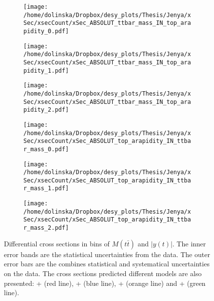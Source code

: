 \begin{sidewaysfigure}[p]
\centering
\begin{subfigure}
  \centering
  \texttt{[image: /home/dolinska/Dropbox/desy\_plots/Thesis/Jenya/xSec/xsecCount/xSec\_ABSOLUT\_ttbar\_mass\_IN\_top\_arapidity\_0.pdf]}
\end{subfigure}
\begin{subfigure}
  \centering
  \texttt{[image: /home/dolinska/Dropbox/desy\_plots/Thesis/Jenya/xSec/xsecCount/xSec\_ABSOLUT\_ttbar\_mass\_IN\_top\_arapidity\_1.pdf]}
\end{subfigure}
\begin{subfigure}
  \centering
  \texttt{[image: /home/dolinska/Dropbox/desy\_plots/Thesis/Jenya/xSec/xsecCount/xSec\_ABSOLUT\_ttbar\_mass\_IN\_top\_arapidity\_2.pdf]}
\end{subfigure}
\begin{subfigure}
  \centering
  \texttt{[image: /home/dolinska/Dropbox/desy\_plots/Thesis/Jenya/xSec/xsecCount/xSec\_ABSOLUT\_top\_arapidity\_IN\_ttbar\_mass\_0.pdf]}
\end{subfigure}
\begin{subfigure}
  \centering
  \texttt{[image: /home/dolinska/Dropbox/desy\_plots/Thesis/Jenya/xSec/xsecCount/xSec\_ABSOLUT\_top\_arapidity\_IN\_ttbar\_mass\_1.pdf]}
\end{subfigure}
\begin{subfigure}
  \centering
  \texttt{[image: /home/dolinska/Dropbox/desy\_plots/Thesis/Jenya/xSec/xsecCount/xSec\_ABSOLUT\_top\_arapidity\_IN\_ttbar\_mass\_2.pdf]}
\end{subfigure}
\caption{Differential cross sections in bins of $M(t\bar{t})$ and $|y(t)|$. The inner error bands are the statistical uncertainties from the data.
         The outer error bars are the combines statistical and systematical uncertainties on the data. The cross sections predicted different models are also presented:
         \MG + \PYTHIA (red line), \Powheg + \PYTHIA (blue line), \Powheg + \HERWIG (orange line) and \MCNLO + \HERWIG (green line).}
\label{fig:XSU_2D_Mtt_yt}
\end{sidewaysfigure}

